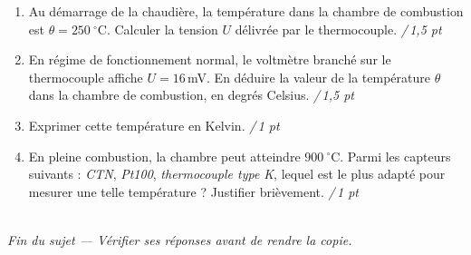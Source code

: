 \documentclass[a4paper,11pt]{article}
\newcommand{\pt}[1]{\hfill\textcolor{gris}{\small\textit{/\,#1 pt}}}
\begin{document}
\begin{enumerate}[label=\textbf{\arabic*.},leftmargin=*,itemsep=4pt]

\item Au démarrage de la chaudière, la température dans la chambre de combustion est $\theta = 250\ ^\circ$C. Calculer la tension $U$ délivrée par le thermocouple. \pt{1,5}

\vspace{1.6cm}

\item En régime de fonctionnement normal, le voltmètre branché sur le thermocouple affiche $U = 16$\,mV. En déduire la valeur de la température $\theta$ dans la chambre de combustion, en degrés Celsius. \pt{1,5}

\vspace{1.6cm}

\item Exprimer cette température en Kelvin. \pt{1}

\vspace{1.2cm}

\item En pleine combustion, la chambre peut atteindre $900\ ^\circ$C. Parmi les capteurs suivants : \emph{CTN}, \emph{Pt100}, \emph{thermocouple type K}, lequel est le plus adapté pour mesurer une telle température ? Justifier brièvement. \pt{1}

\vspace{1.6cm}
\end{enumerate}

\vspace{4pt}
\hrulefill\\[2pt]
\hfill\textit{\small Fin du sujet — Vérifier ses réponses avant de rendre la copie.}
\end{document}
